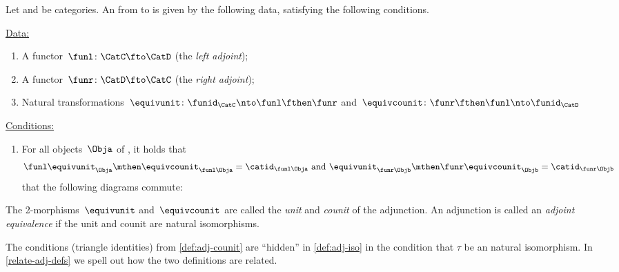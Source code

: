 \begin{ctdefinition}
    \label{def:adj-counit}
    \label{def:cat-adjunction-v2}
    Let \CatC and \CatD be categories.
    An \emph{} from \CatC to \CatD is given by the following data, satisfying the following conditions.

    \underline{Data:}
    \begin{enumerate}
        \item A functor~$\funl \colon \CatC \fto \CatD$ (the \emph{left adjoint});
        \item A functor~$\funr \colon \CatD \fto \CatC$ (the \emph{right adjoint});
        \item Natural transformations~$\equivunit \colon \funid_\CatC \nto \funl  \fthen \funr $ and~$\equivcounit\colon \funr \fthen \funl \nto \funid_\CatD$
    \end{enumerate}

    \underline{Conditions:}
    \begin{enumerate}
        \item For all objects~$\Obja$ of \CatC, it holds that
              \begin{equation*}
                  \funl \equivunit_\Obja \mthen \equivcounit_{\funl\Obja} = \catid_{\funl\Obja} \text{ and }
                  \equivunit_{\funr\Objb} \mthen \funr\equivcounit_\Objb = \catid_{\funr\Objb}
              \end{equation*}
              \text{\ie } that the following diagrams commute:
              \begin{center}
              \end{center}
    \end{enumerate}

    The 2-morphisms~$\equivunit$ and~$\equivcounit$ are called the \emph{unit} and \emph{counit} of the adjunction.
    An adjunction is called an \emph{adjoint equivalence} if the unit and counit are natural isomorphisms.
\end{ctdefinition}

\begin{remark}
    The conditions (triangle identities) from \cref{def:adj-counit} are ``hidden'' in \cref{def:adj-iso} in the condition that $\tau$ be an natural isomorphism.
    In \cref{relate-adj-defs} we spell out how the two definitions are related.
\end{remark}
